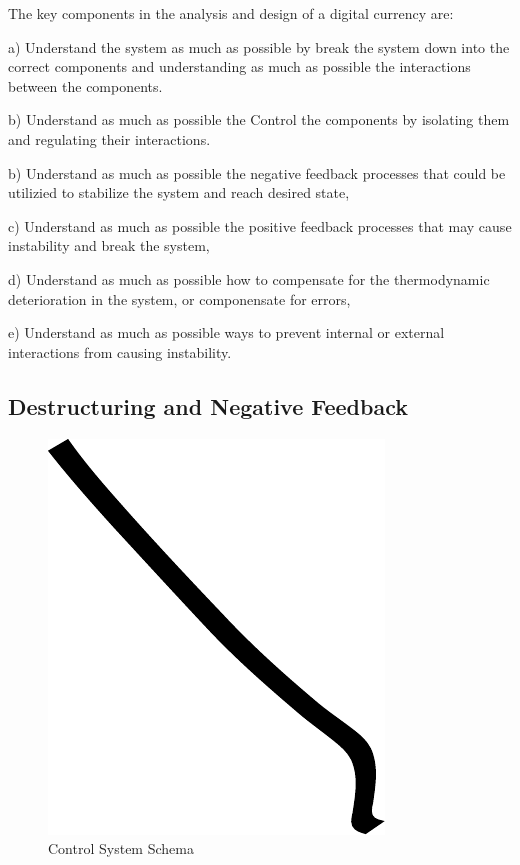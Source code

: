 The key components in the analysis and design of a digital currency are:

a) Understand the system as much as possible by break the system down into the correct components
and understanding as much as possible the interactions between the components.

b) Understand as much as possible the Control the components by isolating them and regulating their
interactions.

b) Understand as much as possible the  negative feedback processes that could be utilizied to
stabilize the system and reach desired state,

c) Understand as much as possible the positive feedback processes that may cause instability and
break the system,

d) Understand as much as possible how to compensate for the thermodynamic deterioration in the
system, or componensate for errors,

e) Understand as much as possible ways to prevent internal or external interactions from causing instability.

\subsection{Destructuring and Negative Feedback}

\begin{figure}
\centering
\includegraphics{img/example.pdf}
\caption{Control System Schema}
\end{figure}

